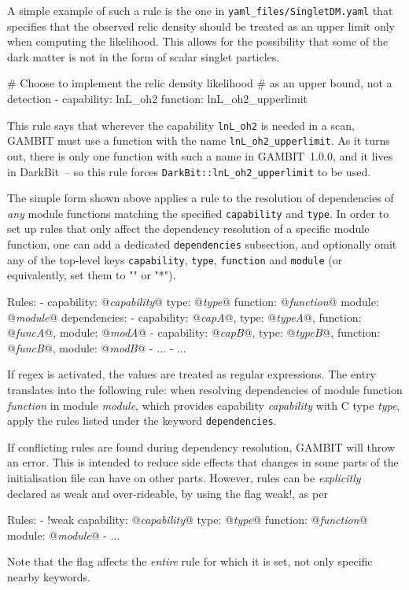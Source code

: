\documentclass[pdftex,twocolumn,epjc3_preprint,runningheads]{svjour3}
\renewcommand{\_}{\discretionary{\underscore}{}{\underscore}}
\newcommand\cpp[1]{{\lstinline!#1!}}  %
\newcommand\yaml[1]{{\lstset{style=yaml}\lstinline!#1!\lstset{style=cpp}}}
\newcommand\yamlvalue[1]{{\YAMLvaluestyle\ttfamily#1}}
\newcommand\term[1]{{\lstset{style=terminal}\lstinline!#1!\lstset{style=cpp}}}
\newcommand\YAMLvaluestyle{\footnotesize\color{blue}\mdseries}
\newcommand{\metavarf}[1]{\textit{\color{darkgreen}\footnotesize\textrm{#1}}}
\newcommand{\metavar}{\metavarf}
\newcommand{\gambit}{\textsf{GAMBIT}\xspace}
\newcommand{\darkbit}{\textsf{DarkBit}\xspace}
\newcommand{\GB}{\gambit}
\newcommand\xx{\raisebox{0.2ex}{\smaller ++}\xspace}
\newcommand\Cpp{\textsf{C\xx}\xspace}
\begin{document}
A simple example of such a rule is the one in \term{yaml_files/SingletDM.yaml} that specifies that the observed relic density
should be treated as an upper limit only when computing the likelihood.  This allows for the possibility that
some of the dark matter is not in the form of scalar singlet particles.
\begin{lstyaml}
# Choose to implement the relic density likelihood
# as an upper bound, not a detection
- capability: lnL_oh2
  function: lnL_oh2_upperlimit
\end{lstyaml}
This rule says that wherever the capability \cpp{lnL_oh2} is needed in a scan, \GB must use a function with the name \cpp{lnL_oh2_upperlimit}.  As it turns out, there is only one function with such a name in \GB\ \textsf{1.0.0}, and it lives in \darkbit\ -- so this rule forces \cpp{DarkBit::lnL_oh2_upperlimit} to be used.

The simple form shown above applies a rule to the resolution of dependencies of \emph{any} module functions matching the specified \yaml{capability} and \yaml{type}.  In order to set up rules that only affect the
dependency resolution of a specific module function, one can add a dedicated \yaml{dependencies} subsection, and optionally omit any of the top-level keys \yaml{capability}, \yaml{type},
\yaml{function} and \yaml{module} (or equivalently, set them to \yamlvalue{""} or \yamlvalue{"*"}).
%
\begin{lstyaml}
Rules:
  - capability: @\metavar{capability}@
    type: @\metavar{type}@
    function: @\metavar{function}@
    module: @\metavar{module}@
    dependencies:
    - {capability: @\metavar{cap\_A}@, type: @\metavar{type\_A}@,
       function: @\metavar{func\_A}@, module: @\metavar{mod\_A}@}
    - {capability: @\metavar{cap\_B}@, type: @\metavar{type\_B}@,
       function: @\metavar{func\_B}@, module: @\metavar{mod\_B}@}
    - ...
  - ...
\end{lstyaml}
If regex is activated, the values are treated as regular expressions.
The entry translates into the following rule:  when resolving dependencies
of module function \metavar{function} in module \metavar{module}, which
provides capability \metavar{capability} with \Cpp type \metavar{type}, apply
the rules listed under the keyword \yaml{dependencies}.

If conflicting rules are found during dependency resolution, \GB will throw an error.
This is intended to reduce side effects that changes in some parts of the initialisation file can
have on other parts.  However, rules can be \emph{explicitly} declared as
weak and over-rideable, by using the flag \yaml{!weak}, as per
%
\begin{lstyaml}
Rules:
  - !weak
    capability: @\metavar{capability}@
    type: @\metavar{type}@
    function: @\metavar{function}@
    module: @\metavar{module}@
  - ...
\end{lstyaml}
%
Note that the flag affects the \emph{entire} rule for which it is set, not only
specific nearby keywords.
\end{document}
